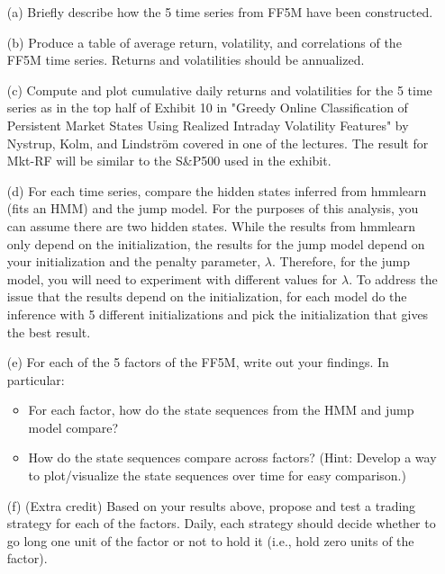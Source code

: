 \documentclass[11pt]{article}
\theoremstyle{plain} %
\theoremstyle{remark}
\begin{document}
\begin{enumerate}
  \item[(a)] Briefly describe how the 5 time series from FF5M have been
  constructed.
  
  \item[(b)] Produce a table of average return, volatility, and correlations of
  the FF5M time series. Returns and volatilities should be annualized.
  
  \item[(c)] Compute and plot cumulative daily returns and volatilities for the
  5 time series as in the top half of Exhibit 10 in "Greedy Online
  Classification of Persistent Market States Using Realized Intraday Volatility
  Features" by Nystrup, Kolm, and Lindström covered in one of the lectures. The
  result for Mkt-RF will be similar to the S\&P500 used in the exhibit.
  
  \item[(d)] For each time series, compare the hidden states inferred from
  hmmlearn (fits an HMM) and the jump model. For the purposes of this analysis,
  you can assume there are two hidden states. While the results from hmmlearn
  only depend on the initialization, the results for the jump model depend on
  your initialization and the penalty parameter, \(\lambda\). Therefore, for the
  jump model, you will need to experiment with different values for \(\lambda\).
  To address the issue that the results depend on the initialization, for each
  model do the inference with 5 different initializations and pick the
  initialization that gives the best result.
  
  \item[(e)] For each of the 5 factors of the FF5M, write out your findings. In
  particular: 
  \begin{itemize}
    \item For each factor, how do the state sequences from the HMM and jump
    model compare?
    \item How do the state sequences compare across factors? (Hint: Develop a
    way to plot/visualize the state sequences over time for easy comparison.)
  \end{itemize}
  
  \item[(f)] (Extra credit) Based on your results above, propose and test a
  trading strategy for each of the factors. Daily, each strategy should decide
  whether to go long one unit of the factor or not to hold it (i.e., hold zero
  units of the factor).
\end{enumerate}
\end{document}
